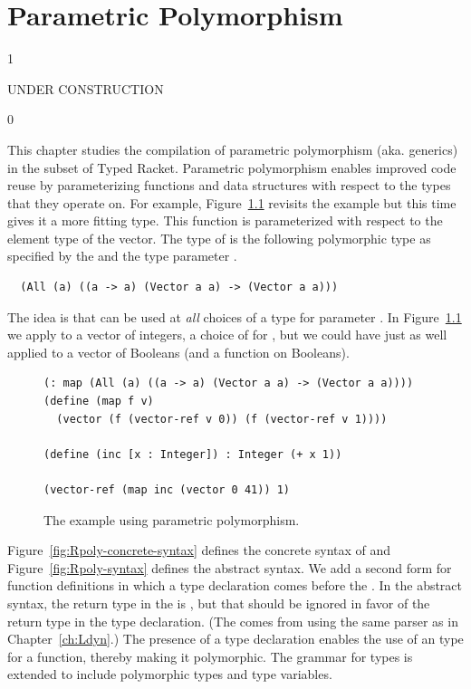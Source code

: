 \documentclass[7x10,nocrop]{TimesAPriori_MIT}%
\def\racketEd{0}
\def\pythonEd{1}
\def\edition{0}
\begin{document}
\chapter{Parametric Polymorphism}
\label{ch:Lpoly}

\if\edition\pythonEd

UNDER CONSTRUCTION

\fi

\if\edition\racketEd

This chapter studies the compilation of parametric
polymorphism
(aka. generics) in the subset \LangPoly{} of Typed
Racket. Parametric polymorphism enables improved code reuse by
parameterizing functions and data structures with respect to the types
that they operate on. For example, Figure~\ref{fig:map-poly}
revisits the  example but this time gives it a more
fitting type.  This  function is parameterized with
respect to the element type of the vector. The type of 
is the following polymorphic type as specified by the  and
the type parameter .
\begin{lstlisting}
  (All (a) ((a -> a) (Vector a a) -> (Vector a a)))
\end{lstlisting}
The idea is that  can be used at \emph{all} choices of a
type for parameter . In Figure~\ref{fig:map-poly} we apply
 to a vector of integers, a choice of  for
, but we could have just as well applied  to a
vector of Booleans (and a function on Booleans).

\begin{figure}[tbp]
\begin{lstlisting}
(: map (All (a) ((a -> a) (Vector a a) -> (Vector a a))))
(define (map f v)
  (vector (f (vector-ref v 0)) (f (vector-ref v 1))))

(define (inc [x : Integer]) : Integer (+ x 1))

(vector-ref (map inc (vector 0 41)) 1)
\end{lstlisting}
\caption{The  example using parametric polymorphism.}
\label{fig:map-poly}
\end{figure}

Figure~\ref{fig:Rpoly-concrete-syntax} defines the concrete syntax of
\LangPoly{} and Figure~\ref{fig:Rpoly-syntax} defines the abstract
syntax. We add a second form for function definitions in which a type
declaration comes before the . In the abstract syntax,
the return type in the  is , but that should be
ignored in favor of the return type in the type declaration.  (The
 comes from using the same parser as in
Chapter~\ref{ch:Ldyn}.)  The presence of a type declaration
enables the use of an  type for a function, thereby making
it polymorphic. The grammar for types is extended to include
polymorphic types and type variables.
\end{document}
